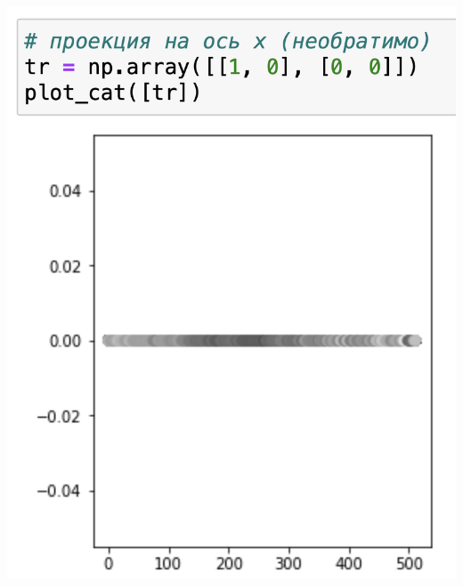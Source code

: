 \documentclass[a4paper, 12pt]{article}
\begin{document}
\begin{spacing}{1.5}
\includegraphics[scale=0.45]{projection_y=0.png}

\end{spacing}
\end{document}
